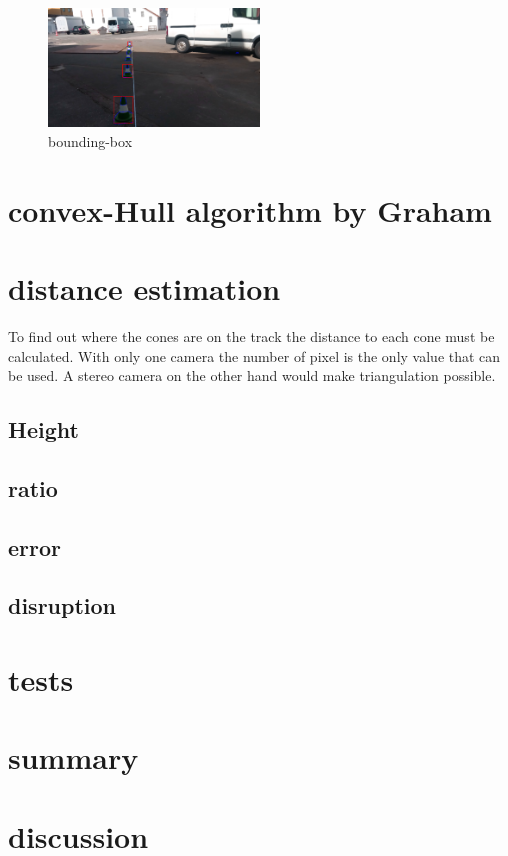 \documentclass[10pt,a4paper]{article}
\begin{document}
	\begin{figure}[h]
		\centering
		\includegraphics[width=0.5\textwidth]{Abb/bounding-box.png}
		\caption{bounding-box}
		\label{bounding-box}
	\end{figure}
	
	\section{convex-Hull algorithm by Graham} \label{convex-hull}
	
	\section{distance estimation}
	To find out where the cones are on the track the distance to each cone must be calculated. 
	With only one camera the number of pixel is the only value that can be used. 
	A stereo camera on the other hand would make triangulation possible.

	\subsection{Height}
	
	\subsection{ratio}
	
	\subsection{error}
	
	\subsection{disruption}
	
	\section{tests}
	
	\section{summary}
	
	\section{discussion}
	
\end{document}

